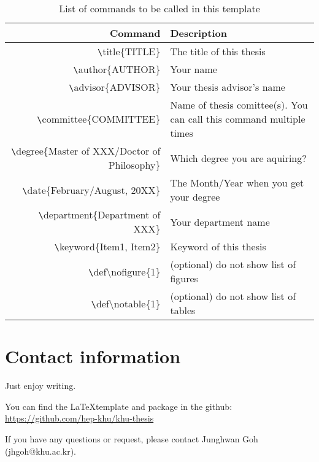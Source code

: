\documentclass[11pt]{article}
\begin{document}
\begin{table}[h]
    \centering
    \caption{List of commands to be called in this template}\label{tab:commands}
    \begin{tabular}{r|l}
        \hline
        Command & Description \\
        \hline\hline
        {\texttt\textbackslash{}title\{TITLE\}} & The title of this thesis \\
        {\texttt\textbackslash{}author\{AUTHOR\}} & Your name \\
        {\texttt\textbackslash{}advisor\{ADVISOR\}} & Your thesis advisor's name \\
        {\texttt\textbackslash{}committee\{COMMITTEE\}} & Name of thesis comittee(s). You can call this command multiple times \\
        {\texttt\textbackslash{}degree\{Master of XXX/Doctor of Philosophy\}} & Which degree you are aquiring? \\
        {\texttt\textbackslash{}date\{February/August, 20XX\}} & The Month/Year when you get your degree \\
        {\texttt\textbackslash{}department\{Department of XXX\}} & Your department name \\
        {\texttt\textbackslash{}keyword\{Item1, Item2\}} & Keyword of this thesis \\
        {\texttt\textbackslash{}def\textbackslash{}nofigure\{1\}} & (optional) do not show list of figures \\
        {\texttt\textbackslash{}def\textbackslash{}notable\{1\}} & (optional) do not show list of tables \\
        \hline
    \end{tabular}
\end{table}

\section{Contact information}
Just enjoy writing. 

You can find the \LaTeX template and package in the github: \url{https://github.com/hep-khu/khu-thesis}

If you have any questions or request, please contact Junghwan Goh (jhgoh@khu.ac.kr).

\newpage

\end{document}
